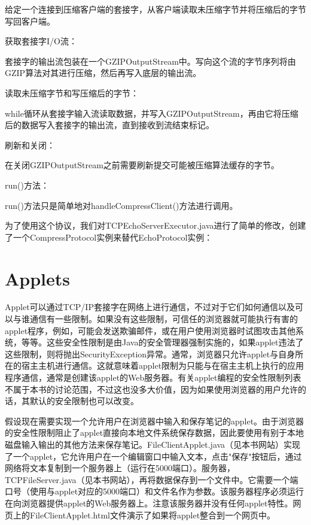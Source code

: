 	给定一个连接到压缩客户端的套接字，从客户端读取未压缩字节并将压缩后的字节写回客户端。 

	获取套接字I/O流：

	套接字的输出流包装在一个GZIPOutputStream中。写向这个流的字节序列将由GZIP算法对其进行压缩，然后再写入底层的输出流。 

	读取未压缩字节和写压缩后的字节：

	while循环从套接字输入流读取数据，并写入GZIPOutputStream，再由它将压缩后的数据写入套接字的输出流，直到接收到流结束标记。 

	刷新和关闭：

	在关闭GZIPOutputStream之前需要刷新提交可能被压缩算法缓存的字节。 

	run()方法：

	run()方法只是简单地对handleCompressClient()方法进行调用。 

	为了使用这个协议，我们对TCPEchoServerExecutor.java进行了简单的修改，创建了一个CompressProtocol实例来替代EchoProtocol实例： 

	

\section{Applets} 

	Applet可以通过TCP/IP套接字在网络上进行通信，不过对于它们如何通信以及可以与谁通信有一些限制。如果没有这些限制，可信任的浏览器就可能执行有害的applet程序，例如，可能会发送欺骗邮件，或在用户使用浏览器时试图攻击其他系统，等等。这些安全性限制是由Java的安全管理器强制实施的，如果applet违法了这些限制，则将抛出SecurityException异常。通常，浏览器只允许applet与自身所在的宿主主机进行通信。这就意味着applet限制为只能与在宿主主机上执行的应用程序通信，通常是创建该applet的Web服务器。有关applet编程的安全性限制列表不属于本书的讨论范围，不过这也没多大价值，因为如果使用浏览器的用户允许的话，其默认的安全限制也可以改变。 

	假设现在需要实现一个允许用户在浏览器中输入和保存笔记的applet。由于浏览器的安全性限制阻止了applet直接向本地文件系统保存数据，因此要使用有别于本地磁盘输入输出的其他方法来保存笔记。FileClientApplet.java（见本书网站）实现了一个applet，它允许用户在一个编辑窗口中输入文本，点击"保存"按钮后，通过网络将文本复制到一个服务器上（运行在5000端口）。服务器，TCPFileServer.java（见本书网站），再将数据保存到一个文件中。它需要一个端口号（使用与applet对应的5000端口）和文件名作为参数。该服务器程序必须运行在向浏览器提供applet的Web服务器上。注意该服务器并没有任何applet特性。网页上的FileClientApplet.html文件演示了如果将applet整合到一个网页中。 

